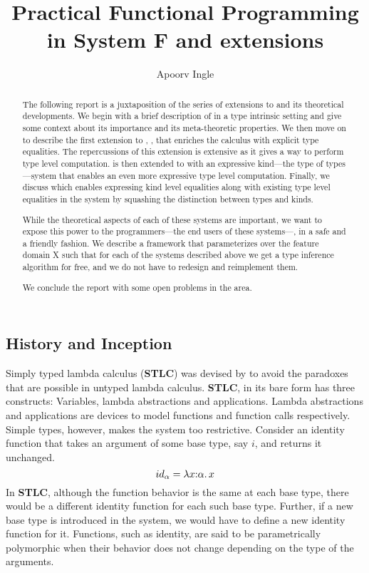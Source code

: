 \documentclass[manuscript,screen,nonacm]{acmart}
\title{Practical Functional Programming in System F and extensions}
\author{Apoorv Ingle}
\affiliation{%
  \institution{University of Iowa}
  \department{Department of Computer Science}
  \streetaddress{McLean Hall}
  \city{Iowa City}
  \state{Iowa}
  \country{USA}}
\begin{document}
\begin{abstract}
The following report is a juxtaposition of the series of extensions to \SF and its theoretical developments. We begin with a brief description of \SF in a type intrinsic setting and give some context about its importance and its meta-theoretic properties. We then move on to describe the first extension to \SF, \SFC, that enriches the calculus with explicit type equalities. The repercussions of this extension is extensive as it gives a way to perform type level computation. \SFC is then extended to \SFP with an expressive kind---the type of types---system that enables an even more expressive type level computation. Finally, we discuss \SFK which enables expressing kind level equalities along with existing type level equalities in the system by squashing the distinction between types and kinds.

While the theoretical aspects of each of these systems are important, we want to expose this power to the programmers---the end users of these systems---, in a safe and a friendly fashion. We describe a framework \HMX that parameterizes over the feature domain X such that for each of the systems described above we get a type inference algorithm for free, and we do not have to redesign and reimplement them.

We conclude the report with some open problems in the area.  
\end{abstract}
\maketitle


\newcommand\STLC{\textbf{STLC}\xspace}
\newcommand\cy[1]{[\citeyear{#1}]}
\section{\SF}
\subsection{History and Inception}
Simply typed lambda calculus (\STLC) was devised by \citet{church_formulation_1940} to avoid the paradoxes that are possible in untyped lambda calculus. \STLC, in its bare form has three constructs: Variables, lambda abstractions and applications. Lambda abstractions and applications are devices to model functions and function calls respectively. Simple types, however, makes the system too restrictive. Consider an identity function that takes an argument of some base type, say $i$, and returns it unchanged.
$$
id_\alpha = \lambda x{:} \alpha.\, x
$$
In \STLC, although the function behavior is the same at each base type, there would be a different identity function for each such base type. Further, if a new base type is introduced in the system, we would have to define a new identity function for it. Functions, such as identity, are said to be parametrically polymorphic\cite{strachey_fundamental_2000} when their behavior does not change depending on the type of the arguments.
\end{document}

